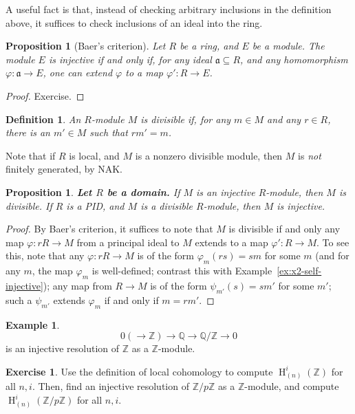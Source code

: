 \documentclass[11pt]{book}
\newtheorem{proposition}[theorem]{Proposition}
\newtheorem{definition}[theorem]{Definition}
\numberwithin{equation}{section}
\numberwithin{theorem}{chapter}
\theoremstyle{definition}
\newtheorem{example}[theorem]{Example}
\newtheorem{exercise}[theorem]{Exercise}
\newtheorem*{basic properties}{Basic Properties}
\newtheorem*{Important Remark}{Important Remark}
\theoremstyle{remark}
\newcommand{\ZZ}{\mathbb{Z}}
\newcommand{\QQ}{\mathbb{Q}}
\newcommand{\A}{\mathfrak{a}}
\renewcommand{\H}{\operatorname{H}}
\begin{document}
A useful fact is that, instead of checking arbitrary inclusions in the definition above, it suffices to check inclusions of an ideal into the ring.

\begin{proposition}[Baer's criterion]
	Let $R$ be a ring, and $E$ be a module. The module $E$ is injective if and only if, for any ideal $\A\subseteq R$, and any homomorphism $\varphi:\A\to E$, one can extend $\varphi$ to a map $\varphi':R\to E$.
\end{proposition}
\begin{proof}
	Exercise.
\end{proof}

\begin{definition}
	An $R$-module $M$ is \emph{divisible} if, for any $m\in M$ and any $r\in R$, there is an $m'\in M$ such that $rm'=m$.
\end{definition}

Note that if $R$ is local, and $M$ is a nonzero divisible module, then $M$ is \emph{not} finitely generated, by NAK.

\begin{proposition}\label{divisible-domain}
	\textbf{Let $R$ be a domain.} If $M$ is an injective $R$-module, then $M$ is divisible. If $R$ is a PID, and $M$ is a divisible $R$-module, then $M$ is injective.
\end{proposition}
\begin{proof}
	By Baer's criterion, it suffices to note that $M$ is divisible if and only any map $\varphi:rR\to M$ from a principal ideal to $M$ extends to a map $\varphi':R\to M$. To see this, note that any $\varphi:rR\to M$ is of the form $\varphi_m(rs)=sm$ for some $m$ (and for any $m$, the map $\varphi_m$ is well-defined; contrast this with Example~\ref{ex:x2-self-injective}); any map from $R\to M$ is of the form $\psi_{m'}(s)=sm'$ for some $m'$; such a $\psi_{m'}$ extends $\varphi_{m}$ if and only if $m=rm'$.
\end{proof}

\begin{example}
	\[0 (\to \ZZ) \to \QQ \to \QQ/\ZZ \to 0 \]
	is an injective resolution of $\ZZ$ as a $\ZZ$-module.
\end{example}



\begin{exercise}
	Use the definition of local cohomology to compute $\H^i_{(n)}(\ZZ)$ for all $n,i$. Then, find an injective resolution of $\ZZ/p\ZZ$ as a $\ZZ$-module, and compute $\H^i_{(n)}(\ZZ/p\ZZ)$ for all $n,i$.
\end{exercise}
\end{document}

